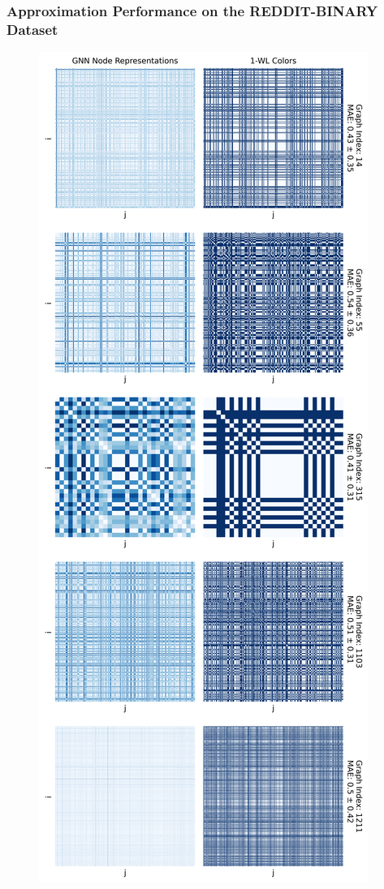 \subsubsection{Approximation Performance on the REDDIT-BINARY Dataset}
\begin{figure}[H]
    \centering
    \begin{minipage}[b]{0.45992852703\textwidth}
        \centering
        \includegraphics[width=\textwidth, left]{Figures/heatmaps_REDDIT-BINARY_0.png}

\end{minipage}
\end{figure}
